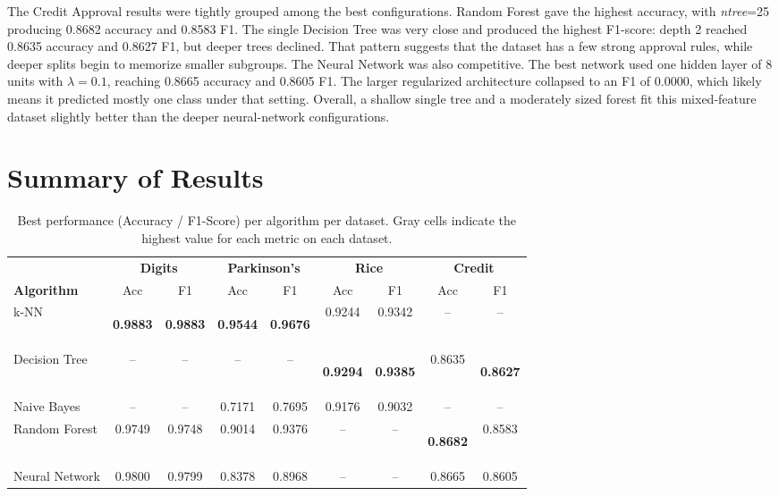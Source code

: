 \documentclass[11pt]{article}
\newcommand{\best}[1]{\colorbox{bestgray}{\strut\textbf{#1}}}
\begin{document}
The Credit Approval results were tightly grouped among the best configurations. Random
Forest gave the highest accuracy, with \textit{ntree}=25 producing 0.8682 accuracy and
0.8583 F1. The single Decision Tree was very close and produced the highest F1-score:
depth 2 reached 0.8635 accuracy and 0.8627 F1, but deeper trees declined. That pattern
suggests that the dataset has a few strong approval rules, while deeper splits begin to
memorize smaller subgroups. The Neural Network was also competitive. The best network
used one hidden layer of 8 units with $\lambda=0.1$, reaching 0.8665 accuracy and
0.8605 F1. The larger regularized architecture collapsed to an F1 of 0.0000, which
likely means it predicted mostly one class under that setting. Overall, a shallow single
tree and a moderately sized forest fit this mixed-feature dataset slightly better than the
deeper neural-network configurations.

\section{Summary of Results}


\begin{table}[H]
\centering
\caption{Best performance (Accuracy / F1-Score) per algorithm per dataset.
  Gray cells indicate the highest value for each metric on each dataset.}
\scriptsize
\setlength{\tabcolsep}{3pt}
\begin{tabular}{l cc cc cc cc}
\toprule
 & \multicolumn{2}{c}{\textbf{Digits}} & \multicolumn{2}{c}{\textbf{Parkinson's}}
 & \multicolumn{2}{c}{\textbf{Rice}} & \multicolumn{2}{c}{\textbf{Credit}} \\
\cmidrule(lr){2-3}\cmidrule(lr){4-5}\cmidrule(lr){6-7}\cmidrule(lr){8-9}
\textbf{Algorithm} & Acc & F1 & Acc & F1 & Acc & F1 & Acc & F1 \\
\midrule
k-NN            & \best{0.9883} & \best{0.9883} & \best{0.9544} & \best{0.9676} & 0.9244 & 0.9342 & -- & -- \\
Decision Tree   & -- & -- & -- & -- & \best{0.9294} & \best{0.9385} & 0.8635 & \best{0.8627} \\
Naive Bayes     & -- & -- & 0.7171 & 0.7695 & 0.9176 & 0.9032 & -- & -- \\
Random Forest   & 0.9749 & 0.9748 & 0.9014 & 0.9376 & -- & -- & \best{0.8682} & 0.8583 \\
Neural Network  & 0.9800 & 0.9799 & 0.8378 & 0.8968 & -- & -- & 0.8665 & 0.8605 \\
\bottomrule
\end{tabular}
\end{table}
\end{document}
